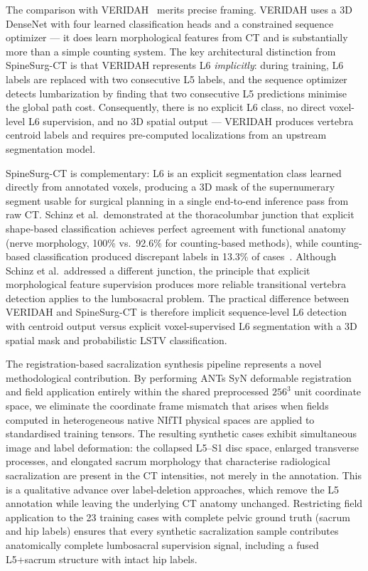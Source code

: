 \documentclass{article}
\begin{document}
The comparison with VERIDAH~\citep{moller2026} merits precise framing.
VERIDAH uses a 3D DenseNet with four learned classification heads and a
constrained sequence optimizer --- it does learn morphological features from CT
and is substantially more than a simple counting system. The key architectural
distinction from SpineSurg-CT is that VERIDAH represents L6 \textit{implicitly}:
during training, L6 labels are replaced with two consecutive L5 labels, and
the sequence optimizer detects lumbarization by finding that two consecutive L5
predictions minimise the global path cost. Consequently, there is no explicit L6
class, no direct voxel-level L6 supervision, and no 3D spatial output --- VERIDAH
produces vertebra centroid labels and requires pre-computed localizations from
an upstream segmentation model.

SpineSurg-CT is complementary: L6 is an explicit segmentation class learned
directly from annotated voxels, producing a 3D mask of the supernumerary segment
usable for surgical planning in a single end-to-end inference pass from raw CT.
Schinz et al.\ demonstrated at the thoracolumbar junction that explicit
shape-based classification achieves perfect agreement with functional anatomy
(nerve morphology, 100\% vs.\ 92.6\% for counting-based methods), while
counting-based classification produced discrepant labels in 13.3\% of
cases~\citep{schinz2025}. Although Schinz et al.\ addressed a different junction,
the principle that explicit morphological feature supervision produces more
reliable transitional vertebra detection applies to the lumbosacral problem.
The practical difference between VERIDAH and SpineSurg-CT is therefore implicit
sequence-level L6 detection with centroid output versus explicit voxel-supervised
L6 segmentation with a 3D spatial mask and probabilistic LSTV classification.

The registration-based sacralization synthesis pipeline represents a novel
methodological contribution. By performing ANTs SyN deformable registration
and field application entirely within the shared preprocessed $256^3$ unit
coordinate space, we eliminate the coordinate frame mismatch that arises when
fields computed in heterogeneous native NIfTI physical spaces are applied to
standardised training tensors. The resulting synthetic cases exhibit
simultaneous image and label deformation: the collapsed L5--S1 disc space,
enlarged transverse processes, and elongated sacrum morphology that characterise
radiological sacralization are present in the CT intensities, not merely in the
annotation. This is a qualitative advance over label-deletion approaches, which
remove the L5 annotation while leaving the underlying CT anatomy unchanged.
Restricting field application to the 23 training cases with complete pelvic
ground truth (sacrum and hip labels) ensures that every synthetic sacralization
sample contributes anatomically complete lumbosacral supervision signal,
including a fused L5+sacrum structure with intact hip labels.
\end{document}
